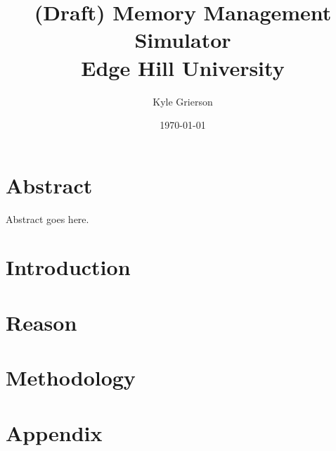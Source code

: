 \documentclass[12pt, twoside]{report}
\title{
	{(Draft) Memory Management Simulator}\\
	{\large Edge Hill University}
}
\author{Kyle Grierson}
\date{\today}
\begin{document}
\maketitle

\chapter*{Abstract}
Abstract goes here.

\tableofcontents

\chapter{Introduction}


\chapter{Reason}


\chapter{Methodology}


\appendix
\chapter{Appendix}
%

\printbibliography
\end{document}
